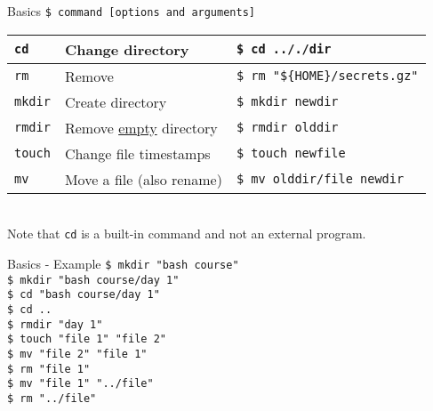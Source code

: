 \documentclass{beamer}
\let\tt\texttt
\let\ul\underline
\begin{document}
\begin{frame}{Basics}
        \tt{\$ command [options and arguments]}  \\
        \begin{tabular}{p{} p{} p{}}
                \hline
                \tt{cd}           &
                Change directory  &
                \tt{\$ cd .././dir}  \\
                \hline
                \tt{rm}           &
                Remove &
                \tt{\$ rm "\$\{HOME\}/secrets.gz"}  \\
                \hline
                \tt{mkdir}           &
                Create directory &
                \tt{\$ mkdir newdir}  \\
                \hline
                \tt{rmdir}           &
                Remove \ul{empty} directory &
                \tt{\$ rmdir olddir}  \\
                \hline
                \tt{touch}               &
                Change file timestamps   &
                \tt{\$ touch newfile}       \\
                \hline
                \tt{mv}                     &
                Move a file (also rename)   &
                \tt{\$ mv olddir/file newdir}  \\
                \hline
        \end{tabular} \\
        Note that \tt{cd} is a built-in command and not an external program.
\end{frame}

\begin{frame}{Basics - Example}
        \tt{\$ mkdir "bash course"}         \\
        \tt{\$ mkdir "bash course/day 1"}   \\
        \tt{\$ cd "bash course/day 1"}      \\
        \tt{\$ cd ..}                       \\
        \tt{\$ rmdir "day 1"}               \\
        \tt{\$ touch "file 1" "file 2"}     \\
        \tt{\$ mv "file 2" "file 1"}        \\
        \tt{\$ rm "file 1"}                 \\
        \tt{\$ mv "file 1" "../file"}       \\
        \tt{\$ rm "../file"}                \\
\end{frame}
\end{document}

